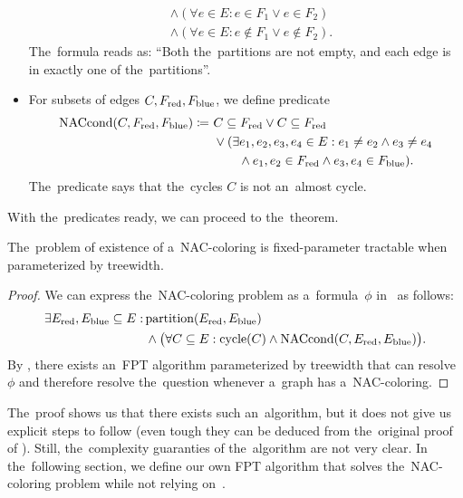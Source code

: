 \begin{itemize}
\begin{align*}
		       & \land (\forall e \in E : e \in F_1 \lor e \in F_2 )          \\
		       & \land (\forall e \in E : e \not\in F_1 \lor e \not\in F_2 ).
	      \end{align*}
	      The~formula reads as: ``Both the~partitions are not empty,
	      and each edge is in exactly one of the~partitions''.
	\item For subsets of edges \( C, F_{\text{red}}, F_{\text{blue}} \), we define predicate
	      \begin{align*}
		      \text{NACcond}(C, F_{\text{red}}, F_{\text{blue}}) \coloneqq \ 
		       & C \subseteq F_{\text{red}} \lor C \subseteq F_{\text{red}}
		      \\
		       & \lor (\exists e_1, e_2, e_3, e_4 \in E :
		      e_1 \ne e_2 \land e_3 \ne e_4
		      \\
		       & \qquad \land e_1, e_2 \in F_{\text{red}} \land e_3, e_4 \in F_{\text{blue}} ).
	      \end{align*}
	      The~predicate says that the~cycles \( C \) is not an~almost cycle.
\end{itemize}
%

With the~predicates ready, we can proceed to the~theorem.
%
\begin{theorem}
	The~problem of existence of a~NAC-coloring is fixed-parameter
	tractable when parameterized by treewidth.
\end{theorem}
%
\begin{proof}
	We can express the~NAC-coloring problem
	as a~formula~\( \phi \) in~\MSO{} as follows:
	\begin{align*}
		\exists E_{\text{red}}, E_{\text{blue}} \subseteq E : \,
		 & \text{partition}(E_{\text{red}}, E_{\text{blue}})                                                                 \\
		 & \land \big(\forall C \subseteq E : \text{cycle}(C) \land \text{NACcond}(C, E_{\text{red}}, E_{\text{blue}}) \big)
		.
	\end{align*}
	By ,
	there exists an~FPT algorithm parameterized by treewidth
	that can resolve \( \phi \) and therefore resolve the~question whenever a~graph has a~NAC-coloring.
\end{proof}
%
The~proof shows us that there exists such an~algorithm,
but it does not give us explicit steps to follow
(even tough they can be deduced from the~original proof of ).
Still, the~complexity guaranties of the~algorithm are not very clear.
In the~following section, we define our
own FPT algorithm that solves the~NAC-coloring problem
while not relying on~\MSO{}.



